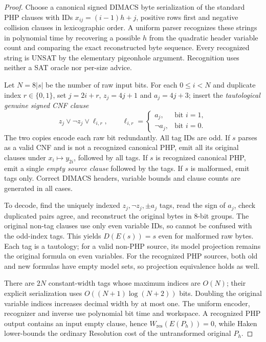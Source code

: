 \documentclass[11pt]{article}
\begin{document}
\begin{proof}
Choose a canonical signed DIMACS byte serialization of the standard PHP clauses with IDs \(x_{ij}=(i-1)h+j\), positive rows first and negative collision clauses in lexicographic order. A uniform parser recognizes these strings in polynomial time by recovering a possible \(h\) from the quadratic header variable count and comparing the exact reconstructed byte sequence. Every recognized string is UNSAT by the elementary pigeonhole argument. Recognition uses neither a SAT oracle nor per-size advice.

Let \(N=8|s|\) be the number of raw input bits. For each \(0\le i<N\) and duplicate index \(r\in\{0,1\}\), set \(j=2i+r\), \(z_j=4j+1\) and \(a_j=4j+3\); insert the \emph{tautological genuine signed CNF clause}
\[
z_j\vee\neg z_j\vee \ell_{i,r},\qquad
\ell_{i,r}=\begin{cases}a_j,&\text{bit }i=1,\\\neg a_j,&\text{bit }i=0.\end{cases}
\]
The two copies encode each raw bit redundantly. All tag IDs are odd. If \(s\) parses as a valid CNF and is not a recognized canonical PHP, emit all its original clauses under \(x_i\mapsto y_{2i}\), followed by all tags. If \(s\) is recognized canonical PHP, emit a single \emph{empty source clause} followed by the tags. If \(s\) is malformed, emit tags only. Correct DIMACS headers, variable bounds and clause counts are generated in all cases.

To decode, find the uniquely indexed \(z_j,\neg z_j,\pm a_j\) tags, read the sign of \(a_j\), check duplicated pairs agree, and reconstruct the original bytes in 8-bit groups. The original non-tag clauses use only even variable IDs, so cannot be confused with the odd-index tags. This yields \(D(E(s))=s\) even for malformed raw bytes. Each tag is a tautology; for a valid non-PHP source, its model projection remains the original formula on even variables. For the recognized PHP sources, both old and new formulas have empty model sets, so projection equivalence holds as well.

There are \(2N\) constant-width tags whose maximum indices are \(O(N)\); their explicit serialization uses \(O((N+1)\log(N+2))\) bits. Doubling the original variable indices increases decimal width by at most one. The uniform encoder, recognizer and inverse use polynomial bit time and workspace. A recognized PHP output contains an input empty clause, hence \(W_{\mathrm{res}}(E(P_h))=0\), while Haken lower-bounds the ordinary Resolution cost of the untransformed original \(P_h\).
\end{proof}
\end{document}
